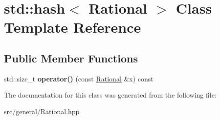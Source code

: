 \hypertarget{classstd_1_1hash_3_01Rational_01_4}{}\section{std\+::hash$<$ Rational $>$ Class Template Reference}
\label{classstd_1_1hash_3_01Rational_01_4}
\subsection*{Public Member Functions}
\begin{DoxyCompactItemize}
\item 
\mbox{\label{classstd_1_1hash_3_01Rational_01_4_a3eafa9680a4c7978171d32ca8d2bbf9e}} 
std\+::size\+\_\+t {\bfseries operator()} (const \mbox{\hyperlink{classRational}{Rational}} \&x) const
\end{DoxyCompactItemize}


The documentation for this class was generated from the following file\+:\begin{DoxyCompactItemize}
\item 
src/general/Rational.\+hpp\end{DoxyCompactItemize}
